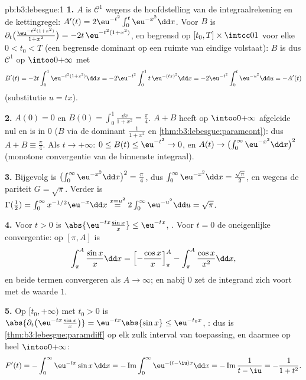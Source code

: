 \begin{solution}{pb:b3:lebesgue:1}
\textbf{1.} $A$ is $\mathcal C^1$ wegens de hoofdstelling van de
integraalrekening en de kettingregel: $A'(t) =
2\eu^{-t^2}\int_0^t\eu^{-x^2}\dd x$. Voor $B$ is
$\partial_t\bigl(\frac{\eu^{-t^2(1+x^2)}}{1+x^2}\bigr) =
-2t\,\eu^{-t^2(1+x^2)}$,  en begrensd op $[t_0, T] \times
\intcc01$ voor elke $0 < t_0 < T$ (een begrensde dominant op een
ruimte van eindige  volstaat): $B$ is dus $\mathcal C^1$ op
$\intoo0{+\infty}$ met
\[
B'(t) = -2t\int_0^1 \eu^{-t^2(1+x^2)}\dd x
= -2\eu^{-t^2}\int_0^1 t\,\eu^{-(tx)^2}\dd x
= -2\eu^{-t^2}\int_0^t\eu^{-u^2}\dd u = -A'(t)
\]
(substitutie $u = tx$).

\textbf{2.} $A(0) = 0$ en $B(0) = \int_0^1\frac{\dd x}{1+x^2} =
\frac\pi4$. $A + B$ heeft op $\intoo0{+\infty}$ afgeleide nul en
is  in $0$ ($B$ via de dominant $\frac1{1+x^2}$ en
\cref{thm:b3:lebesgue:paramcont}): dus $A + B \equiv \frac\pi4$.
Als $t\to+\infty$: $0 \leq B(t) \leq \eu^{-t^2} \to 0$, en $A(t)
\to \bigl(\int_0^\infty\eu^{-x^2}\dd x\bigr)^2$ (monotone
convergentie van de binnenste integraal).

\textbf{3.} Bijgevolg is $\bigl(\int_0^\infty\eu^{-x^2}\dd
x\bigr)^2 = \frac\pi4$, dus $\int_0^\infty\eu^{-x^2}\dd x =
\frac{\sqrt\pi}2$, en wegens de pariteit $G = \sqrt\pi$. Verder is
$\Gamma(\frac12) = \int_0^\infty x^{-1/2}\eu^{-x}\dd x
\overset{x = u^2}{=} 2\int_0^\infty\eu^{-u^2}\dd u = \sqrt\pi$.

\textbf{4.} Voor $t > 0$ is $\abs{\eu^{-tx}\frac{\sin x}x} \leq
\eu^{-tx}$, . Voor $t = 0$ de oneigenlijke
convergentie: op $[\pi, A]$ is
\[
\int_\pi^A\frac{\sin x}x\dd x
= \Bigl[-\frac{\cos x}x\Bigr]_\pi^A -
\int_\pi^A\frac{\cos x}{x^2}\dd x,
\]
en beide termen convergeren als $A \to \infty$; en nabij $0$ zet
de integrand zich  voort met de waarde $1$.

\textbf{5.} Op $[t_0, +\infty)$ met $t_0 > 0$ is
$\abs{\partial_t\bigl(\eu^{-tx}\tfrac{\sin x}x\bigr)} =
\eu^{-tx}\abs{\sin x} \leq \eu^{-t_0x}$, : dus is
\cref{thm:b3:lebesgue:paramdiff} op elk zulk interval van
toepassing, en daarmee op heel $\intoo0{+\infty}$:
\[
F'(t) = -\int_0^\infty\eu^{-tx}\sin x\,\dd x
= -\operatorname{Im}\int_0^\infty\eu^{-(t - \iu)x}\dd x
= -\operatorname{Im}\frac{1}{t - \iu} = -\frac{1}{1 + t^2}.
\]


\end{solution}
